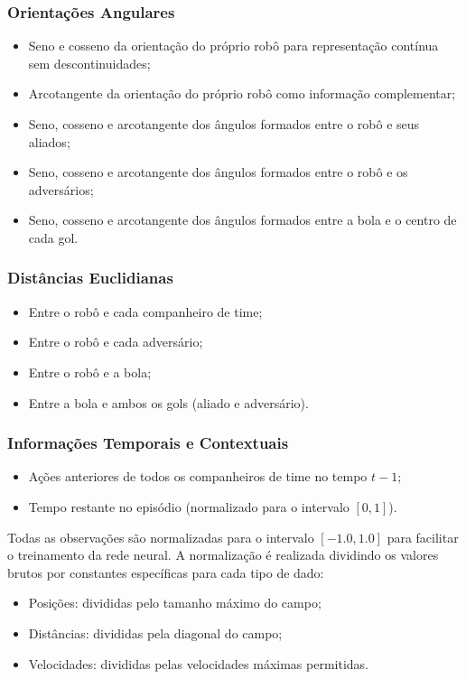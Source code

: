 \subsubsection{Orientações Angulares}
\begin{itemize}
    \item Seno e cosseno da orientação do próprio robô para representação contínua sem descontinuidades;
    \item Arcotangente da orientação do próprio robô como informação complementar;
    \item Seno, cosseno e arcotangente dos ângulos formados entre o robô e seus aliados;
    \item Seno, cosseno e arcotangente dos ângulos formados entre o robô e os adversários;
    \item Seno, cosseno e arcotangente dos ângulos formados entre a bola e o centro de cada gol.
\end{itemize}

\subsubsection{Distâncias Euclidianas}
\begin{itemize}
    \item Entre o robô e cada companheiro de time;
    \item Entre o robô e cada adversário;
    \item Entre o robô e a bola;
    \item Entre a bola e ambos os gols (aliado e adversário).
\end{itemize}

\subsubsection{Informações Temporais e Contextuais}
\begin{itemize}
    \item Ações anteriores de todos os companheiros de time no tempo $t-1$;
    \item Tempo restante no episódio (normalizado para o intervalo $[0,1]$).
\end{itemize}

Todas as observações são normalizadas para o intervalo $[-1.0, 1.0]$ para facilitar o treinamento da rede neural. A normalização é realizada dividindo os valores brutos por constantes específicas para cada tipo de dado:
\begin{itemize}
    \item Posições: divididas pelo tamanho máximo do campo;
    \item Distâncias: divididas pela diagonal do campo;
    \item Velocidades: divididas pelas velocidades máximas permitidas.
\end{itemize}

